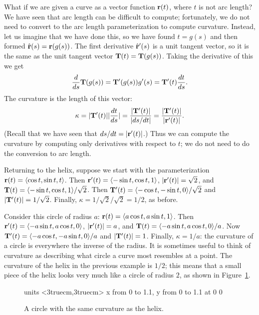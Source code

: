 What if we are given a curve as a vector function ${\bf r}(t)$, where
$t$ is not arc length? We have seen that arc length can be difficult
to compute; fortunately, we do not need to convert to the arc length
parameterization to compute curvature. Instead, let us imagine that we have
done this, so we have found $t=g(s)$ and then formed
$\hat{\bf r}(s)={\bf r}(g(s))$. The first derivative $\hat{\bf r}'(s)$
is a unit tangent vector, so it is the same as the unit tangent vector
${\bf T}(t)={\bf T}(g(s))$. Taking the derivative of this we get
$${d\over ds}{\bf T}(g(s))= {\bf T}'(g(s)) g'(s)={\bf T}'(t){dt\over
  ds}.$$
The curvature is the length of this vector:
$$\kappa = |{\bf T}'(t)||{dt\over ds}|={|{\bf T}'(t)|\over|ds/dt|}=
{|{\bf T}'(t)|\over|{\bf r}'(t)|}.$$
(Recall that we have seen that $ds/dt=|{\bf r}'(t)|$.) Thus we can
compute the curvature by computing only derivatives with respect to
$t$; we do not need to do the conversion to arc length.

\begin{example}{}{}
Returning to the helix, suppose we start with the parameterization
${\bf r}(t)=\langle \cos t,\sin t,t\rangle$. Then 
${\bf r}'(t)=\langle -\sin t,\cos t,1\rangle$, 
$|{\bf r}'(t)|=\sqrt2$, and ${\bf T}(t)=\langle -\sin t,\cos
t,1\rangle/\sqrt2$. Then
${\bf T}'(t)=\langle -\cos t,-\sin t,0\rangle/\sqrt2$ and 
$|{\bf T}'(t)|=1/\sqrt2$. Finally, $\kappa=1/\sqrt2/\sqrt2=1/2$,
as before.
\end{example}

\begin{example}
Consider this circle of radius $a$:
${\bf r}(t)=\langle a\cos t,a\sin t,1\rangle$. Then 
${\bf r}'(t)=\langle -a\sin t,a\cos t,0\rangle$, 
$|{\bf r}'(t)|=a$, and ${\bf T}(t)=\langle -a\sin t,a\cos
t,0\rangle/a$. Now
${\bf T}'(t)=\langle -a\cos t,-a\sin t,0\rangle/a$ and 
$|{\bf T}'(t)|=1$. Finally, $\kappa=1/a$:
the curvature of a circle is everywhere the inverse of the radius. It
is sometimes useful to think of curvature as describing what circle a
curve most resembles at a point. The curvature of the helix in the
previous example is $1/2$; this means that a small piece of the helix
looks very much like a circle of radius $2$, as shown in
Figure~\ref{fig:osculating circle}.
\end{example}

\begin{figure}[H]
\centerline{
\vbox{\beginpicture
\normalgraphs
\setcoordinatesystem units <3truecm,3truecm>
\setplotarea x from 0 to 1.1, y from 0 to 1.1
 at 0 0
\endpicture}}
\caption{A circle with the same curvature as the helix. \label{fig:osculating circle}}
\end{figure}

